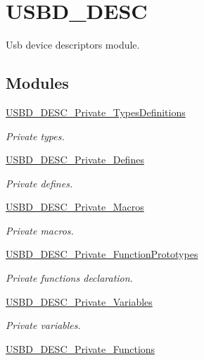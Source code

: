 \hypertarget{group__USBD__DESC}{}\section{U\+S\+B\+D\+\_\+\+D\+E\+SC}
\label{group__USBD__DESC}


Usb device descriptors module.  


\subsection*{Modules}
\begin{DoxyCompactItemize}
\item 
\hyperlink{group__USBD__DESC__Private__TypesDefinitions}{U\+S\+B\+D\+\_\+\+D\+E\+S\+C\+\_\+\+Private\+\_\+\+Types\+Definitions}
\begin{DoxyCompactList}\small\item\em Private types. \end{DoxyCompactList}\item 
\hyperlink{group__USBD__DESC__Private__Defines}{U\+S\+B\+D\+\_\+\+D\+E\+S\+C\+\_\+\+Private\+\_\+\+Defines}
\begin{DoxyCompactList}\small\item\em Private defines. \end{DoxyCompactList}\item 
\hyperlink{group__USBD__DESC__Private__Macros}{U\+S\+B\+D\+\_\+\+D\+E\+S\+C\+\_\+\+Private\+\_\+\+Macros}
\begin{DoxyCompactList}\small\item\em Private macros. \end{DoxyCompactList}\item 
\hyperlink{group__USBD__DESC__Private__FunctionPrototypes}{U\+S\+B\+D\+\_\+\+D\+E\+S\+C\+\_\+\+Private\+\_\+\+Function\+Prototypes}
\begin{DoxyCompactList}\small\item\em Private functions declaration. \end{DoxyCompactList}\item 
\hyperlink{group__USBD__DESC__Private__Variables}{U\+S\+B\+D\+\_\+\+D\+E\+S\+C\+\_\+\+Private\+\_\+\+Variables}
\begin{DoxyCompactList}\small\item\em Private variables. \end{DoxyCompactList}\item 
\hyperlink{group__USBD__DESC__Private__Functions}{U\+S\+B\+D\+\_\+\+D\+E\+S\+C\+\_\+\+Private\+\_\+\+Functions}

\end{DoxyCompactItemize}
